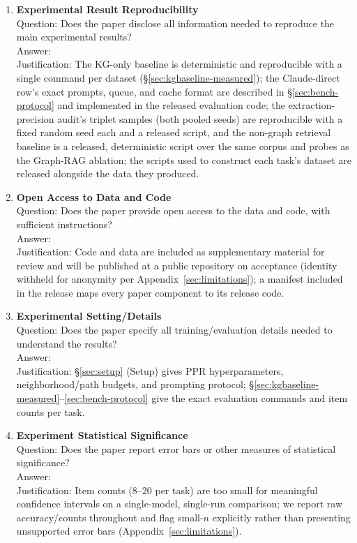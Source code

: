 \documentclass{article}
\begin{document}
\begin{enumerate}
\item \textbf{Experimental Result Reproducibility}\\
    Question: Does the paper disclose all information needed to reproduce the main experimental results?\\
    Answer: \answerYes{}\\
    Justification: The KG-only baseline is deterministic and reproducible with a single command per dataset (\S\ref{sec:kgbaseline-measured}); the Claude-direct row's exact prompts, queue, and cache format are described in \S\ref{sec:bench-protocol} and implemented in the released evaluation code; the extraction-precision audit's triplet samples (both pooled seeds) are reproducible with a fixed random seed each and a released script, and the non-graph retrieval baseline is a released, deterministic script over the same corpus and probes as the Graph-RAG ablation; the scripts used to construct each task's dataset are released alongside the data they produced.

\item \textbf{Open Access to Data and Code}\\
    Question: Does the paper provide open access to the data and code, with sufficient instructions?\\
    Answer: \answerYes{}\\
    Justification: Code and data are included as supplementary material for review and will be published at a public repository on acceptance (identity withheld for anonymity per Appendix~\ref{sec:limitations}); a manifest included in the release maps every paper component to its release code.

\item \textbf{Experimental Setting/Details}\\
    Question: Does the paper specify all training/evaluation details needed to understand the results?\\
    Answer: \answerYes{}\\
    Justification: \S\ref{sec:setup} (Setup) gives PPR hyperparameters, neighborhood/path budgets, and prompting protocol; \S\ref{sec:kgbaseline-measured}--\ref{sec:bench-protocol} give the exact evaluation commands and item counts per task.

\item \textbf{Experiment Statistical Significance}\\
    Question: Does the paper report error bars or other measures of statistical significance?\\
    Answer: \answerNo{}\\
    Justification: Item counts (8--20 per task) are too small for meaningful confidence intervals on a single-model, single-run comparison; we report raw accuracy/counts throughout and flag small-$n$ explicitly rather than presenting unsupported error bars (Appendix~\ref{sec:limitations}).


\end{enumerate}
\end{document}
